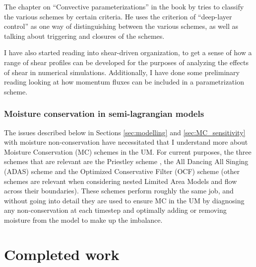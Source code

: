 \documentclass[11pt,a4paper]{article}
\begin{document}
The chapter on ``Convective parameterizations'' in the book by \cite{stensrud2009parameterization} tries to classify the various schemes by certain criteria. He uses the criterion of ``deep-layer control'' as one way of distinguishing between the various schemes, as well as talking about triggering and closures of the schemes.

I have also started reading into shear-driven organization, to get a sense of how a range of shear profiles can be developed for the purposes of analyzing the effects of shear in numerical simulations. Additionally, I have done some preliminary reading looking at how momentum fluxes can be included in a parametrization scheme.


\subsubsection{Moisture conservation in semi-lagrangian models}
\label{sec:MC_in_SL}
The issues described below in Sections \ref{sec:modelling} and \ref{sec:MC_sensitivity} with moisture non-conservation have necessitated that I understand more about Moisture Conservation (MC) schemes in the UM. For current purposes, the three schemes that are relevant are the Priestley scheme \parencite{priestley1993quasi}, the All Dancing All Singing (ADAS) scheme \parencite{zerroukat2010simple} and the Optimized Conservative Filter (OCF) scheme \parencite{zerroukat2015monotonic} (other schemes are relevant when considering nested Limited Area Models and flow across their boundaries). These schemes perform roughly the same job, and without going into detail they are used to ensure MC in the UM by diagnosing any non-conservation at each timestep and optimally adding or removing moisture from the model to make up the imbalance.


\section{Completed work}
\end{document}
